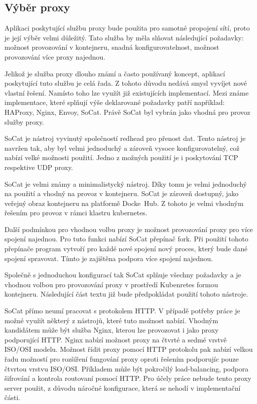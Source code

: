\subsection{Výběr proxy}
Aplikaci poskytující službu proxy bude použita pro samotné propojení sítí, proto je její výběr velmi důležitý. Tato služba by měla slňovat následující požadavky: možnost provozování v kontejneru, snadná konfigurovatelnost, možnost provozování více proxy najednou.

Jelikož je služba proxy dlouho známí a často používaný koncept, aplikací poskytující tuto službu je celá řada. Z tohoto důvodu nedává smysl vyvíjet nové vlastní řešení. Namísto toho lze využít již existujících implementací. Mezi známe implementace, které splňují výše deklarované požadavky patří například: HAProxy, Nginx, Envoy, SoCat. Právě SoCat byl vybrán jako vhodná pro provoz služby proxy.

SoCat je nástroj vyvinutý společností redhead pro přenost dat. Tento nástroj je navržen tak, aby byl velmi jednoduchý a zároveň vysoce konfigurovatelný, což nabízí velké možnosti použití. Jedno z možných použití je i poskytování TCP respektive UDP proxy.\cite{amoany_2020_getting}

SoCat je velmi známy a minimalistycký nástroj. Díky tomu je velmi jednoduchý na použití a vhodný na provoz v kontejneru. SoCat je zároveň dostupný, jako veřejný obraz kontejneru na platformě Docke~Hub. Z tohoto je velmi vhodným řešením pro provoz v rámci klastru kubernetes.

Další podmínkou pro vhodnou volbu proxy je možnost provozování proxy pro více spojení najednou. Pro tuto funkci nabízí SoCat přepínač fork. Při použití tohoto přepínače program vytvoří pro každé nové spojení nový proces, který bude dané spojení spravovat. Tímto je zajištěna podpora více spojení najednou.

Společně s jednoduchou konfigurací tak SoCat splňuje všechny požadavky a je vhodnou volbou pro provozování proxy v prostředí Kubenretes formou kontejneru. Následující část textu již bude předpokládat použití tohoto nástroje. 

\bigskip

SoCat přímo neumí pracovat s protokolem HTTP. V případě potřeby práce je možné využít některý z nástrojů, které tuto možnost nabízí. Vhodným kandidátem může být služba Nginx, kterou lze provozovat i jako proxy podporující HTTP. Nginx nabízí možnost proxy na čtvrté a sedmé vrstvě ISO/OSI modelu. Možnost řídit proxy pomocí HTTP protokolu pak nabízí velkou řadu možností pro rozšíření fungování proxy oproti řešením podporujíc pouze čtvrtou vrstvu ISO/OSI. Příkladem může být pokročilý load-balancing, podpora šifrování a kontrola routovaní pomocí HTTP. Pro účely práce nebude tento proxy server použit, z důvodu náročné konfigurace, která se nehodí v implementační části.      

